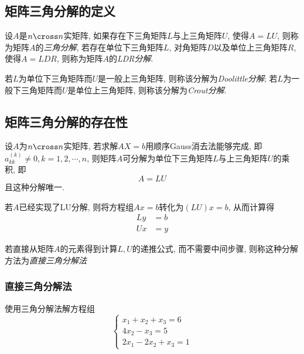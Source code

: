 \subsection{矩阵三角分解的定义}
\begin{definition}
    设$A$是$n\cross n$实矩阵, 如果存在下三角矩阵$L$与上三角矩阵$U$, 使得$A=LU$, 则称为矩阵$A$的\emph{三角分解}, 若存在单位下三角矩阵$L$, 对角矩阵$D$以及单位上三角矩阵$R$, 使得$A=LDR$, 则称为矩阵$A$的\emph{LDR分解}.
\end{definition}

若$L$为单位下三角矩阵而$U$是一般上三角矩阵, 则称该分解为\emph{Doolittle分解}; 若$L$为一般下三角矩阵而$U$是单位上三角矩阵, 则称该分解为\emph{Crout分解}.

\subsection{矩阵三角分解的存在性}

\begin{theorem}
    设$A$为$n\cross n$实矩阵, 若求解$AX=b$用顺序Gauss消去法能够完成, 即$a_{kk}^{(k)}\ne 0, k=1,2,\cdots,n$, 则矩阵$A$可分解为单位下三角矩阵$L$与上三角矩阵$U$的乘积, 即
    \begin{equation*}
        A=LU
    \end{equation*}
    且这种分解唯一.
\end{theorem}

若$A$已经实现了LU分解, 则将方程组$Ax=b$转化为$(LU)x=b$, 从而计算得
\begin{align*}
    Ly&=b\\
    Ux&=y
\end{align*}

若直接从矩阵$A$的元素得到计算$L,U$的递推公式, 而不需要中间步骤, 则称这种分解方法为\emph{直接三角分解法}

\subsubsection{直接三角分解法}
\begin{example}\label{example:三角分解法解方程组}
    使用三角分解法解方程组
    \begin{equation*}
        \begin{cases}
            x_1+x_2+x_3=6\\
            4x_2-x_3=5\\
            2x_1-2x_2+x_3=1
        \end{cases}
    \end{equation*}
\end{example}

